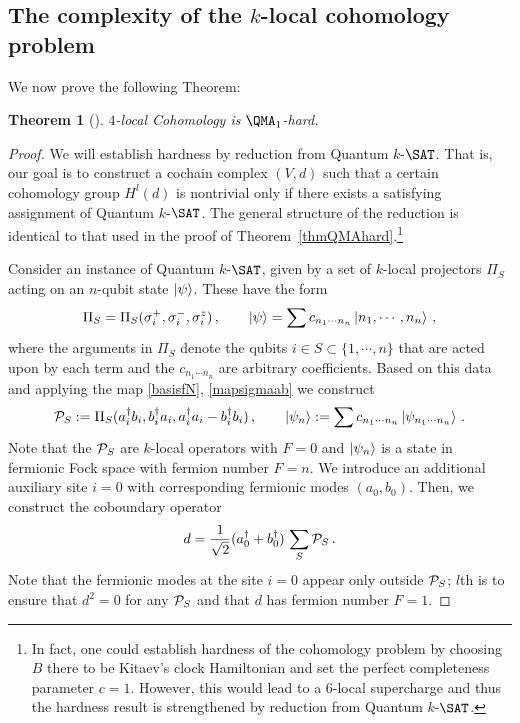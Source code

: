 \documentclass[11pt]{article}
\numberwithin{equation}{section}
\def\cP{{\cal P}}
\newcommand\equ[1] {\begin{equation}#1\end{equation}}
\renewcommand\( {\left(}
\renewcommand\) {\right)}
\newtheorem{thm}{Theorem}
\begin{document}
\subsection{The complexity of the $k$-local cohomology problem}

We now prove the following Theorem:

\begin{thm}[]\label{thmCohomology}
{\sc $4$-local Cohomology} is $\QMA_{1}$-hard.
\end{thm}


\begin{proof}

We will establish hardness by reduction from  {\sc Quantum $k$-$\SAT$}. That is, our goal is to construct a cochain complex $(V,d)$ such that a certain cohomology group $H^l(d)$ is nontrivial only if there exists a satisfying assignment of {\sc Quantum $k$-$\SAT$}.  The general structure of the reduction is identical to that used in the proof of Theorem~\ref{thmQMAhard}.\footnote{In fact, one could establish hardness of the cohomology problem by choosing $B$ there to be Kitaev's clock Hamiltonian \cite{KitaevBook} and set the perfect completeness parameter $c=1$. However, this would lead to a $6$-local supercharge and thus the hardness result is strengthened by reduction from  {\sc Quantum $k$-$\SAT$}.} 

Consider an instance of {\sc Quantum $k$-$\SAT$}, given by a set of $k$-local projectors $\Pi_S$ acting on an $n$-qubit state  $\ket{\psi}$. These have the form
\equ{
\Pi_{S}=\Pi_{S}(\sigma_{i}^{+},\sigma_{i}^{-},\sigma_{i}^{z})\,,\qquad \ket{\psi}=\sum c_{n_{1}\cdots n_{n}}\ket{n_{1},\cdots, n_{n}}\,,
}
where the arguments in $\Pi_S$ denote the qubits $i\in S\subset \{1,\cdots,n\}$ that are acted upon by each term and the $c_{n_{1}\cdots n_{n}}$ are arbitrary coefficients. Based on this data and applying the map \eqref{basisfN},   \eqref{mapsigmaab}  we construct 
\equ{\label{PsPsi}
\cP_{S}:= \Pi_{S}(a_{i}^{\dagger}b_{i},b_{i}^{\dagger}a_{i},a_{i}^{\dagger}a_{i}-b_{i}^{\dagger}b_{i})\,,\qquad \ket{\psi_{n}}:=\sum c_{n_{1}\cdots n_{n}} \ket{\psi_{n_{1}\cdots n_{n}}}\,.
} 
 Note that the $\cP_{S}$ are $k$-local operators with $F=0$ and $\ket{\psi_n}$ is a state in fermionic Fock space with fermion number $F=n$. 
We  introduce an additional auxiliary site $i=0$ with corresponding fermionic modes $(a_0,b_0)$. Then, we construct the coboundary operator 
\equ{\label{dPs}
d=\frac{1}{\sqrt 2}(a_{0}^{\dagger}+b_{0}^{\dagger}) \, \sum_{S} \cP_{S}\,.
}
 Note that the fermionic modes at the site $i=0$ appear only outside $\cP_{S}$; $l$th is to ensure that $d^{2}=0$ for any $\cP_{S}$ and that $d$ has fermion number $F=1$. 
 

\end{proof}
\end{document}
